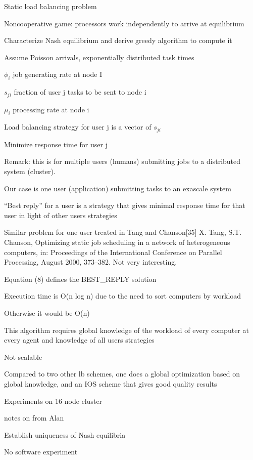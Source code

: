 \documentclass{article}
\begin{document}
Static load balancing problem

Noncooperative game: processors work independently to arrive at equilibrium

Characterize Nash equilibrium and derive greedy algorithm to compute it

Assume Poisson arrivals, exponentially distributed task times

$\phi_i$ job generating rate at node I

$s_{ji}$ fraction of user j tasks to be sent to node i

$\mu_i$ processing rate at node i 

Load balancing strategy for user j is a vector of ${ s_{ji} }$

Minimize response time for user j

Remark: this is for multiple users (humans) submitting jobs to a distributed system (cluster).

Our case is one user (application) submitting tasks to an exascale system

“Best reply” for a user is a strategy that gives minimal response time for that user in light of other users strategies

Similar problem for one user treated in Tang and Chanson[35]
X. Tang, S.T. Chanson, Optimizing static job scheduling in a network
of heterogeneous computers, in: Proceedings of the International
Conference on Parallel Processing, August 2000, 373–382. Not very interesting.

Equation (8) defines the BEST\_REPLY solution

Execution time is O(n log n) due to the need to sort computers by workload

Otherwise it would be O(n)

This algorithm requires global knowledge of the workload of every computer at every agent and knowledge of all users strategies

Not scalable

Compared to two other lb schemes, one does a global optimization based on global knowledge, and an IOS scheme that gives good quality results

Experiments on 16 node cluster



\medskip

notes on
\cite{doi:10.1142/S0219198902000574}
from Alan


Establish uniqueness of Nash equilibria

No software experiment
\end{document}
